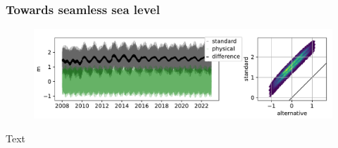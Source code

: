\begin{frame}
\frametitle{Towards seamless sea level}
\begin{minipage}{0.45\textwidth}
    \begin{figure}      
    \includegraphics[width=\textwidth]{figures/plots/piecewiseTide_62430.pdf}
    \end{figure}
\end{minipage}
\hfill
\begin{minipage}{0.45\textwidth}
    Text
\end{minipage}
\end{frame}